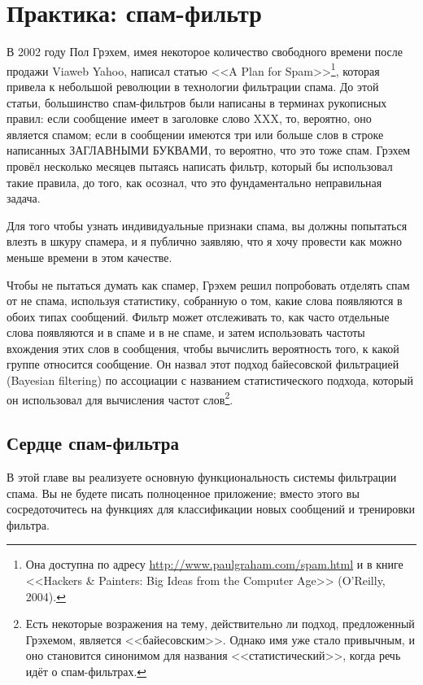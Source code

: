 \chapter{Практика: спам-фильтр}
\label{ch:23}

\thispagestyle{empty}

В 2002 году Пол Грэхем, имея некоторое количество свободного времени пос\-ле продажи
Viaweb Yahoo, написал статью <<A Plan for Spam>>\footnote{Она доступна по адресу
  \url{http://www.paulgraham.com/spam.html} и в книге <<Hackers \& Painters: Big Ideas from
  the Computer Age>> (O'Reilly, 2004).}, которая привела к небольшой революции в технологии
фильтрации спама.  До этой статьи, большинство спам-фильтров были написаны в терминах
рукописных правил: если сообщение имеет в заголовке слово XXX, то, вероятно, оно является
спамом; если в сообщении имеются три или больше слов в строке написанных ЗАГЛАВНЫМИ
БУКВАМИ, то вероятно, что это тоже спам. Грэхем провёл несколько месяцев пытаясь написать
фильтр, который бы использовал такие правила, до того, как осознал, что это фундаментально
неправильная задача.

Для того чтобы узнать индивидуальные признаки спама, вы должны попытаться влезть в шкуру
спамера, и я публично заявляю, что я хочу провести как можно меньше времени в этом
качестве.

Чтобы не пытаться думать как спамер, Грэхем решил попробовать отделять спам от не спама,
используя статистику, собранную о том, какие слова появляются в обоих типах сообщений.
Фильтр может отслеживать то, как часто отдельные слова появляются и в спаме и в не спаме,
и затем использовать частоты вхождения этих слов в сообщения, чтобы вычислить вероятность
того, к какой группе относится сообщение.  Он назвал этот подход байесовской фильтрацией
(Bayesian filtering) по ассоциации с названием статистического подхода, который он
использовал для вычисления частот слов\footnote{Есть некоторые возражения на тему,
  действительно ли подход, предложенный Грэхемом, является <<байесовским>>.  Однако имя уже
  стало привычным, и оно становится синонимом для названия <<статистический>>, когда речь
  идёт о спам-фильтрах.}.

\section{Сердце спам-фильтра}

В этой главе вы реализуете основную функциональность системы фильтрации спама.  Вы не
будете писать полноценное приложение; вместо этого вы сосредоточитесь на функциях для
классификации новых сообщений и тренировки фильтра.

